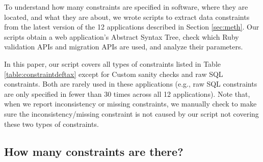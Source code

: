 
To understand how many constraints are  specified in  software, where they are located, and what they are about, we wrote scripts to extract data constraints from the latest version of 
the 12 applications described in Section \ref{sec:meth}. Our scripts obtain a web application's Abstract Syntax Tree, check which Ruby validation APIs and migration APIs are used, and analyze their parameters.

In this paper, our script covers all types of constraints listed
in Table \ref{table:constraintdeftax} except for   
Custom sanity checks and raw SQL constraints. Both are rarely used in these
applications (e.g., raw SQL constraints are only specified in fewer than
30 times across all 12 applications). Note that, when we report inconsistency
or missing constraints, 
we manually check to make sure the inconsistency/missing constraint is not caused by
our script not covering these two types of constraints.


\subsection{How many constraints are there?}

